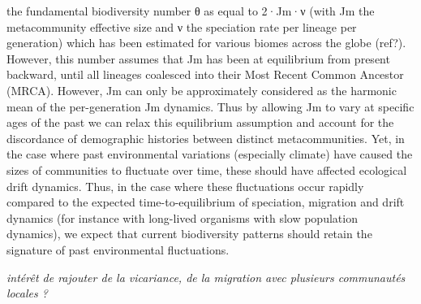 \documentclass[
]{article}
\begin{document}
the fundamental biodiversity number θ as equal to 2·Jm·ν (with Jm the
metacommunity effective size and ν the speciation rate per lineage per
generation) which has been estimated for various biomes across the globe
(ref?). However, this number assumes that Jm has been at equilibrium
from present backward, until all lineages coalesced into their Most
Recent Common Ancestor (MRCA). However, Jm can only be approximately
considered as the harmonic mean of the per-generation Jm dynamics. Thus
by allowing Jm to vary at specific ages of the past we can relax this
equilibrium assumption and account for the discordance of demographic
histories between distinct metacommunities. Yet, in the case where past
environmental variations (especially climate) have caused the sizes of
communities to fluctuate over time, these should have affected
ecological drift dynamics. Thus, in the case where these fluctuations
occur rapidly compared to the expected time-to-equilibrium of
speciation, migration and drift dynamics (for instance with long-lived
organisms with slow population dynamics), we expect that current
biodiversity patterns should retain the signature of past environmental
fluctuations.

\emph{intérêt de rajouter de la vicariance, de la migration avec
plusieurs communautés locales ?}
\end{document}
